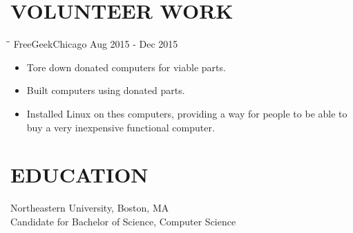 \documentclass{res}
\begin{document}
\begin{resume}
        \section{VOLUNTEER WORK}
\vspace{-0.1in}
\begin{tabbing}
  \hspace{2.3in}\= \hspace{2.6in}\= \kill
  FreeGeekChicago \>\> Aug 2015 - Dec 2015
\end{tabbing}
\begin{itemize}[leftmargin= .1in] \itemsep -2pt
\item Tore down donated computers for viable parts.
\item Built computers using donated parts.
  \item Installed Linux on thes computers, providing a way for people to be able to buy a very inexpensive functional computer.
\end{itemize}
        \section{EDUCATION}
Northeastern University, Boston, MA \\
Candidate for Bachelor of Science, Computer Science   \\

\end{resume}
\end{document}
